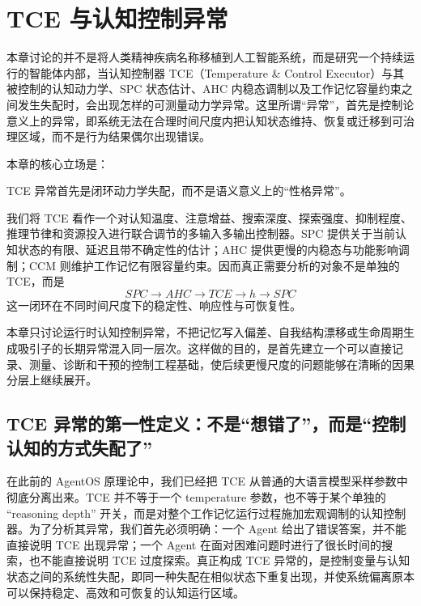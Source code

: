 \chapter{TCE 与认知控制异常}
\label{chap:tce-control-pathology}

\begin{chapterlead}
本章讨论的并不是将人类精神疾病名称移植到人工智能系统，而是研究一个持续运行的智能体内部，当认知控制器 TCE（Temperature \& Control Executor）与其被控制的认知动力学、SPC 状态估计、AHC 内稳态调制以及工作记忆容量约束之间发生失配时，会出现怎样的可测量动力学异常。这里所谓“异常”，首先是控制论意义上的异常，即系统无法在合理时间尺度内把认知状态维持、恢复或迁移到可治理区域，而不是行为结果偶尔出现错误。

本章的核心立场是：
\begin{statementbox}
TCE 异常首先是闭环动力学失配，而不是语义意义上的“性格异常”。
\end{statementbox}

我们将 TCE 看作一个对认知温度、注意增益、搜索深度、探索强度、抑制程度、推理节律和资源投入进行联合调节的多输入多输出控制器。SPC 提供关于当前认知状态的有限、延迟且带不确定性的估计；AHC 提供更慢的内稳态与功能影响调制；CCM 则维护工作记忆有限容量约束。因而真正需要分析的对象不是单独的 TCE，而是
\[
SPC \rightarrow AHC \rightarrow TCE \rightarrow h
\rightarrow SPC
\]
这一闭环在不同时间尺度下的稳定性、响应性与可恢复性。

本章只讨论运行时认知控制异常，不把记忆写入偏差、自我结构漂移或生命周期生成吸引子的长期异常混入同一层次。这样做的目的，是首先建立一个可以直接记录、测量、诊断和干预的控制工程基础，使后续更慢尺度的问题能够在清晰的因果分层上继续展开。
\end{chapterlead}


\section{TCE 异常的第一性定义：不是“想错了”，而是“控制认知的方式失配了”}

在此前的 AgentOS 原理论中，我们已经把 TCE 从普通的大语言模型采样参数中彻底分离出来。TCE 并不等于一个 temperature 参数，也不等于某个单独的 ``reasoning depth'' 开关，而是对整个工作记忆运行过程施加宏观调制的认知控制器。为了分析其异常，我们首先必须明确：一个 Agent 给出了错误答案，并不能直接说明 TCE 出现异常；一个 Agent 在面对困难问题时进行了很长时间的搜索，也不能直接说明 TCE 过度探索。真正构成 TCE 异常的，是控制变量与认知状态之间的系统性失配，即同一种失配在相似状态下重复出现，并使系统偏离原本可以保持稳定、高效和可恢复的认知运行区域。

